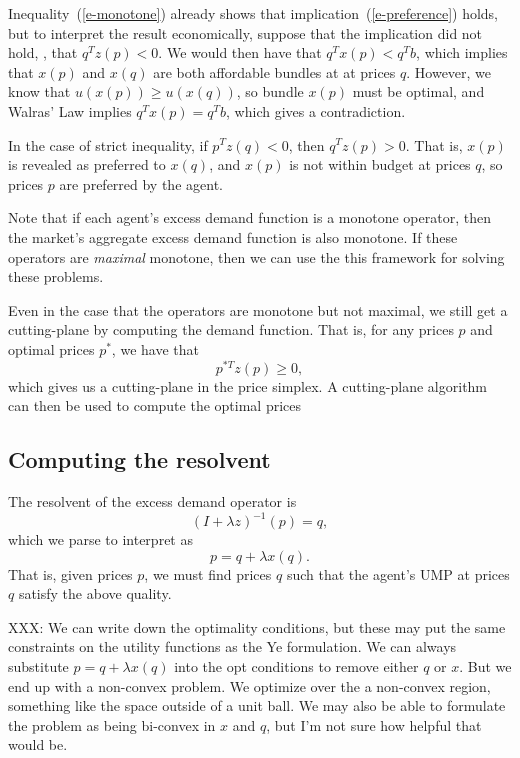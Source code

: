 \documentclass{article}
\begin{document}
Inequality~(\ref{e-monotone}) already shows that implication~(\ref{e-preference})
holds, but to interpret the result economically, suppose that the
implication did not hold, \ie, that $q^T z(p) < 0$. We would then have that
$q^T x(p) < q^T b$, which implies that $x(p)$ and $x(q)$ are both affordable
bundles at at prices $q$. However, we know that $u(x(p)) \geq u(x(q))$, so
bundle $x(p)$ must be optimal, and Walras' Law implies $q^T x(p) = q^T b$, which
gives a contradiction. 

In the case of strict inequality, if $p^T z(q) < 0$, then $q^T z(p) > 0$.
That is, $x(p)$ is revealed as preferred to $x(q)$, and $x(p)$ is not within
budget at prices $q$, so prices $p$ are preferred by the agent.

Note that if each agent's excess demand function is a monotone operator, then
the market's aggregate excess demand function is also monotone. If these
operators are \emph{maximal} monotone, then we can use the this framework for
solving these problems. 

Even in the case that the operators are monotone but not maximal, we still get
a cutting-plane by computing the demand function. That is, for any prices $p$
and optimal prices $p^*$, we have that
\[
p^{*T} z(p) \geq 0,
\]
which gives us a cutting-plane in the price simplex.
A cutting-plane algorithm can then be used to compute the optimal prices

\subsection{Computing the resolvent}
The resolvent of the excess demand operator is
\[
(I + \lambda z)^{-1}(p) = q,
\]
which we parse to interpret as
\[
p = q + \lambda x(q).
\]
That is, given prices $p$, we must find prices $q$ such that the agent's UMP
at prices $q$ satisfy the above quality.

XXX: We can write down the optimality conditions, but these may put the same
constraints on the utility functions as the Ye formulation. We can always
substitute $p = q + \lambda x(q)$ into the opt conditions to remove either
$q$ or $x$. But we end up with a non-convex problem. We optimize over the a
non-convex region, something like the space outside of a unit ball.
We may also be able to formulate the problem as being bi-convex in $x$ and $q$,
but I'm not sure how helpful that would be.

\newpage


\end{document}
